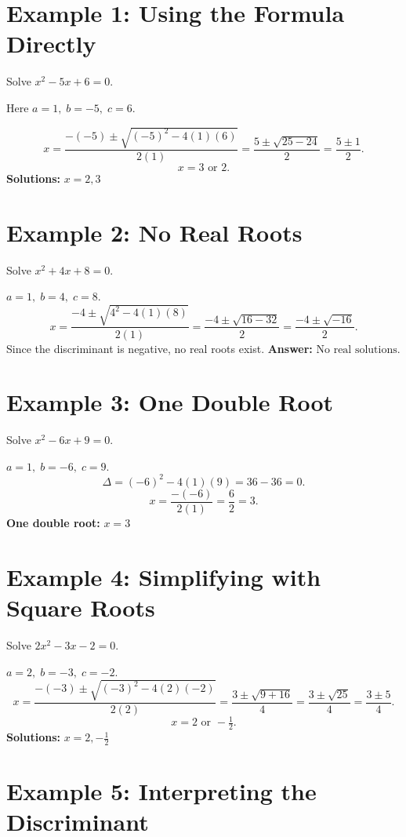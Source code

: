 \documentclass[14pt]{extarticle}
\begin{document}
\section*{Example 1: Using the Formula Directly}

Solve \(x^2 - 5x + 6 = 0.\)

Here \(a = 1,\; b = -5,\; c = 6.\)

\[
x = \frac{-(-5) \pm \sqrt{(-5)^2 - 4(1)(6)}}{2(1)} 
= \frac{5 \pm \sqrt{25 - 24}}{2} 
= \frac{5 \pm 1}{2}.
\]
\[
x = 3 \text{ or } 2.
\]
\textbf{Solutions:} \(\boxed{x = 2, 3}\)

\section*{Example 2: No Real Roots}

Solve \(x^2 + 4x + 8 = 0.\)

\(a = 1,\; b = 4,\; c = 8.\)
\[
x = \frac{-4 \pm \sqrt{4^2 - 4(1)(8)}}{2(1)} 
= \frac{-4 \pm \sqrt{16 - 32}}{2} 
= \frac{-4 \pm \sqrt{-16}}{2}.
\]
Since the discriminant is negative, no real roots exist.  
\textbf{Answer:} \(\boxed{\text{No real solutions.}}\)

\section*{Example 3: One Double Root}

Solve \(x^2 - 6x + 9 = 0.\)

\(a = 1,\; b = -6,\; c = 9.\)
\[
\Delta = (-6)^2 - 4(1)(9) = 36 - 36 = 0.
\]
\[
x = \frac{-(-6)}{2(1)} = \frac{6}{2} = 3.
\]
\textbf{One double root:} \(\boxed{x = 3}\)

\section*{Example 4: Simplifying with Square Roots}

Solve \(2x^2 - 3x - 2 = 0.\)

\(a = 2,\; b = -3,\; c = -2.\)
\[
x = \frac{-(-3) \pm \sqrt{(-3)^2 - 4(2)(-2)}}{2(2)} 
= \frac{3 \pm \sqrt{9 + 16}}{4}
= \frac{3 \pm \sqrt{25}}{4}
= \frac{3 \pm 5}{4}.
\]
\[
x = 2 \text{ or } -\tfrac{1}{2}.
\]
\textbf{Solutions:} \(\boxed{x = 2, -\tfrac{1}{2}}\)

\section*{Example 5: Interpreting the Discriminant}
\end{document}
